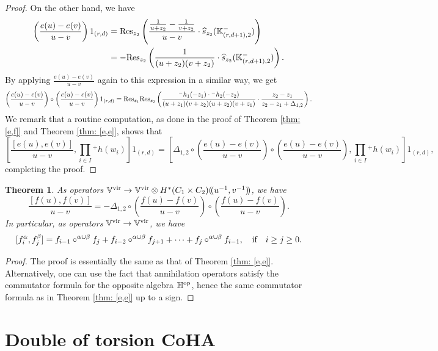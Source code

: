 \documentclass[10pt]{amsart}
\newcommand{\BK}{\mathbb{K}}
\newcommand{\BH}{\mathbb{H}}
\newcommand{\BV}{\mathbb{V}}
\newcommand{\op}{\textnormal{op}}
\newcommand{\+}{{}^+}
\newcommand{\vir}{\textnormal{vir}}
\newcommand{\Res}{\textnormal{Res}}
\newtheorem{theorem}{Theorem}[section]
\theoremstyle{definition}
\theoremstyle {definition}
\theoremstyle {definition}
\begin{document}
\begin{proof}
On the other hand, we have
\begin{align*}
    \left(
    \frac{e(u)-e(v)}{u-v}
    \right)1_{(r,d)}
    &=\Res_{z_2}\left(\frac{\frac{1}{u+z_2}-\frac{1}{v+z_2}}{u-v}\cdot\widehat s_{z_2}(\BK^-_{(r,d+1),2})
    \right)\\
    &=-\Res_{z_2}\left(\frac{1}{(u+z_2)(v+z_2)}\cdot\widehat s_{z_2}(\BK^-_{(r,d+1),2})
    \right).
\end{align*}
By applying $\frac{e(u)-e(v)}{u-v}$ again to this expression in a similar way, we get
$$\left(
    \frac{e(u)-e(v)}{u-v}
    \right)\circ\left(
    \frac{e(u)-e(v)}{u-v}
    \right)1_{(r,d)}
    =\Res_{z_1}\Res_{z_2}\left(
    \frac{{}^{-}h_1(-z_1)\cdot {}^{-}h_2(-z_2)}{(u+z_1)(v+z_2)(u+z_2)(v+z_1)}\cdot \frac{z_2-z_1}{z_2-z_1+\Delta_{1,2}}
    \right).
$$
We remark that a routine computation, as done in the proof of Theorem \ref{thm: [e,f]} and Theorem \ref{thm: [e,e]}, shows that 
$$\left[\frac{[e(u),e(v)]}{u-v}, \prod_{i\in I}{}^{+}h(w_i)\right]1_{(r,d)}
=\left[ \Delta_{1,2}\circ \left(\frac{e(u)-e(v)}{u-v}
    \right)\circ\left(
    \frac{e(u)-e(v)}{u-v}
    \right) , \prod_{i\in I}{}^{+}h(w_i)\right]1_{(r,d)},
$$
completing the proof.
\end{proof}


\begin{theorem} \label{thm: [f,f]}
    As operators $\BV^\vir\rightarrow \BV^\vir\otimes H^*(C_1\times C_2)(\!(u^{-1},v^{-1})\!)$, we have
    $$\frac{[f(u), f(v)]}{u-v}=-\Delta_{1,2}\circ \left(\frac{f(u)-f(v)}{u-v}\right)\circ \left(\frac{f(u)-f(v)}{u-v}\right).
    $$
    In particular, as operators $\BV^\vir\rightarrow \BV^\vir$, we have
    $$[f^\alpha_i, f^\beta_j]=f_{i-1}\circ^{\alpha\cup \beta}f_{j}+f_{i-2}\circ^{\alpha\cup \beta}f_{j+1}+\cdots + f_{j}\circ^{\alpha\cup \beta}f_{i-1},\quad\textnormal{if}\quad i\geq j\geq 0.
    $$
\end{theorem}
\begin{proof}
    The proof is essentially the same as that of Theorem \ref{thm: [e,e]}. Alternatively, one can use the fact that annihilation operators satisfy the commutator formula for the opposite algebra $\BH^\op$, hence the same commutator formula as in Theorem \ref{thm: [e,e]} up to a sign. 
\end{proof}


\section{Double of torsion CoHA}\label{sec: Drinfeld double}
\end{document}
